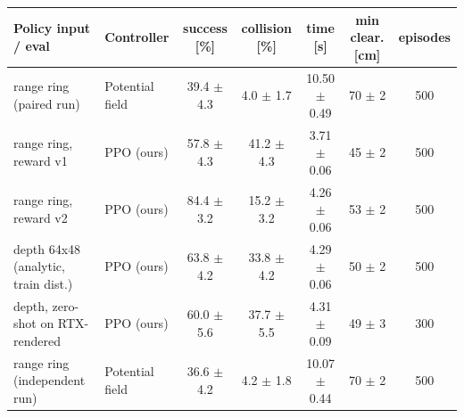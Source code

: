 \begin{tabular}{llccccc}\toprule
Policy input / eval & Controller & success [\%] & collision [\%] & time [s] & min clear. [cm] & episodes\\\midrule
range ring (paired run) & Potential field & 39.4 $\pm$ 4.3 & 4.0 $\pm$ 1.7 & 10.50 $\pm$ 0.49 & 70 $\pm$ 2 & 500\\
\midrule
range ring, reward v1 & PPO (ours) & 57.8 $\pm$ 4.3 & 41.2 $\pm$ 4.3 & 3.71 $\pm$ 0.06 & 45 $\pm$ 2 & 500\\
\midrule
range ring, reward v2 & PPO (ours) & 84.4 $\pm$ 3.2 & 15.2 $\pm$ 3.2 & 4.26 $\pm$ 0.06 & 53 $\pm$ 2 & 500\\
\midrule
depth 64x48 (analytic, train dist.) & PPO (ours) & 63.8 $\pm$ 4.2 & 33.8 $\pm$ 4.2 & 4.29 $\pm$ 0.06 & 50 $\pm$ 2 & 500\\
\midrule
depth, zero-shot on RTX-rendered & PPO (ours) & 60.0 $\pm$ 5.6 & 37.7 $\pm$ 5.5 & 4.31 $\pm$ 0.09 & 49 $\pm$ 3 & 300\\
\midrule
range ring (independent run) & Potential field & 36.6 $\pm$ 4.2 & 4.2 $\pm$ 1.8 & 10.07 $\pm$ 0.44 & 70 $\pm$ 2 & 500\\
\bottomrule\end{tabular}
